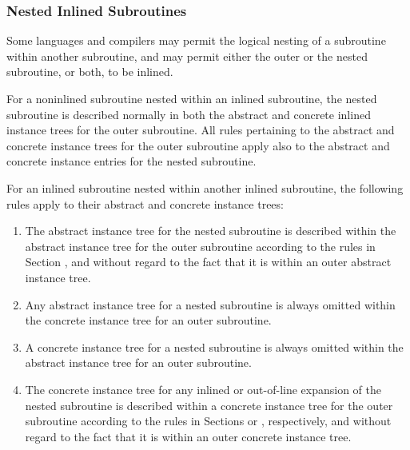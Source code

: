 \subsubsection{Nested Inlined Subroutines}
\label{nestedinlinedsubroutines}
Some languages and compilers may permit the logical nesting of
a subroutine within another subroutine, and may permit either
the outer or the nested subroutine, or both, to be inlined.

For a non\dash inlined subroutine nested within an inlined
subroutine, the nested subroutine is described normally in
both the abstract and concrete inlined instance trees for
the outer subroutine. All rules pertaining to the abstract
and concrete instance trees for the outer subroutine apply
also to the abstract and concrete instance entries for the
nested subroutine.

For an inlined subroutine nested within another inlined
subroutine, the following rules apply to their abstract and
concrete instance trees:

\begin{enumerate}[1.]
\item The abstract instance tree for the nested subroutine is
described within the abstract instance tree for the outer
subroutine according to the rules in 
Section , and
without regard to the fact that it is within an outer abstract
instance tree.

\item Any abstract instance tree for a nested subroutine is
always omitted within the concrete instance tree for an
outer subroutine.

\item  A concrete instance tree for a nested subroutine is
always omitted within the abstract instance tree for an
outer subroutine.

\item The concrete instance tree for any inlined or 
out-of-line
expansion of the nested subroutine is described within a
concrete instance tree for the outer subroutine according
to the rules in 
Sections  or 
, respectively,
and without regard to the fact that it is within an outer
concrete instance tree.
\end{enumerate}

